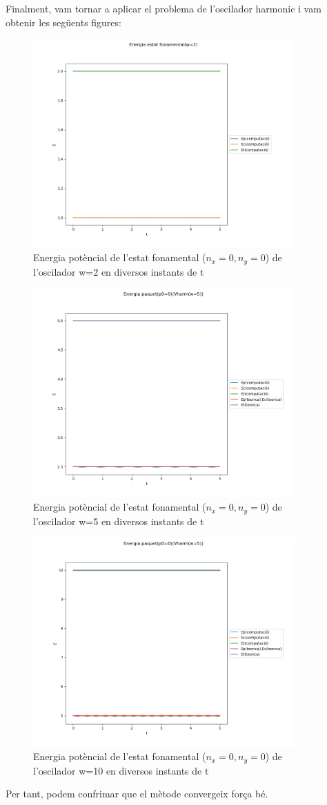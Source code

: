 \documentclass{article}
\begin{document}
Finalment, vam tornar a aplicar el problema de l'oscilador harmonic i vam obtenir les següents figures:

\begin{figure}[H]
	\includegraphics[width=\textwidth,height=8cm]{Eharm2.png}
	\caption{Energia potèncial de l'estat fonamental (\(n_x=0,n_y=0\)) de l'oscilador w=2 en diversos instants de t}
\end{figure}
\begin{figure}[H]
	\includegraphics[width=\textwidth,height=8cm]{Eharmpot3.png}
	\caption{Energia potèncial de l'estat fonamental (\(n_x=0,n_y=0\)) de l'oscilador w=5 en diversos instants de t}
\end{figure}
\begin{figure}[H]
	\includegraphics[width=\textwidth,height=8cm]{Eharmpot4.png}
	\caption{Energia potèncial de l'estat fonamental (\(n_x=0,n_y=0\)) de l'oscilador w=10 en diversos instants de t}
\end{figure}

Per tant, podem confrimar que el mètode convergeix força bé.
\end{document}

